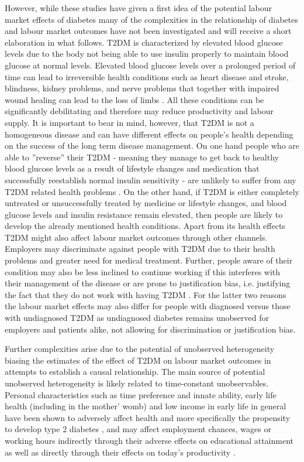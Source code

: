 \documentclass[12pt,english,british]{article}
\begin{document}
However, while these studies have given a first idea of the potential labour market effects of diabetes many of the complexities in the relationship of diabetes and labour market outcomes have not been investigated and will receive a short elaboration in what follows. \ac{T2DM} is characterized by elevated blood glucose levels due to the body not being able to use insulin properly to maintain blood glucose at normal levels. Elevated blood glucose levels over a prolonged period of time can lead to irreversible health conditions such as heart disease and stroke, blindness, kidney problems, and nerve problems that together with impaired wound healing can lead to the loss of limbs \citep{Reynoso-Noveron2011}. All these conditions can be significantly debilitating and therefore may reduce productivity and labour supply. It is important to bear in mind, however, that \ac{T2DM} is not a homogeneous
disease and can have different effects on people's health depending
on the success of the long term disease management. On one hand people
who are able to ''reverse'' their \ac{T2DM} - meaning they manage
to get back to healthy blood glucose levels as a result of lifestyle
changes and medication that successfully reestablish normal insulin sensitivity -
are unlikely to suffer from any \ac{T2DM} related health problems \citep{Lim2011, Gregg2012}.
On the other hand, if \ac{T2DM} is either completely untreated or unsuccessfully
treated by medicine or lifestyle changes, and blood glucose levels
and insulin resistance remain elevated, then people are likely to develop the already mentioned health conditions. Apart from its health effects \ac{T2DM} might also affect labour market outcomes through other channels. Employers may discriminate against
people with \ac{T2DM} due to their health problems and greater
need for medical treatment. Further, people aware of their condition
may also be less inclined to continue working if this interferes with
their management of the disease or are prone to justification bias, i.e. justifying the fact that they do not work with having \ac{T2DM} \citet{Kapteyn2009}. For the latter two reasons the labour
market effects may also differ for people with diagnosed versus those
with undiagnosed \ac{T2DM} as undiagnosed diabetes remains unobserved for employers and patients alike, not allowing for discrimination or justification bias. 

Further complexities arise due to the potential of unobserved heterogeneity biasing the estimates of the effect of \ac{T2DM} on labour market outcomes in attempts to establish a causal relationship. The main source of potential unobserved heterogeneity is likely related to time-constant unobservables. Personal characteristics such as time preference and innate ability, early life
health (including in the mother' womb) and low income in early life
in general have been shown to adversely affect health and more specifically
the propensity to develop type 2 diabetes \citep{VanEwijk2011,Sotomayor2013,Li2010b},
and may affect employment chances, wages or working hours indirectly
through their adverse effects on educational attainment \citep{Ayyagari2011a}
as well as directly through their effects on today's productivity
\citep{Currie2013}.
\end{document}
